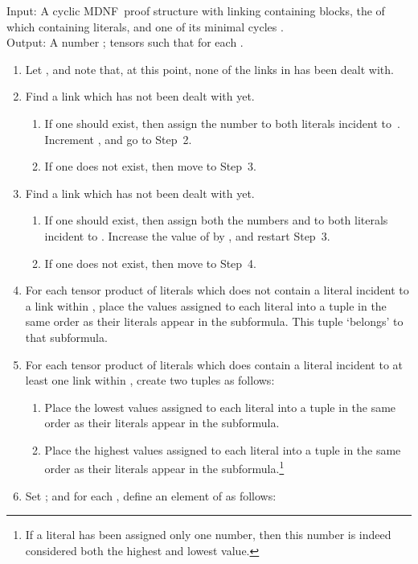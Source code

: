 \documentclass{LMCS}
\theoremstyle{plain}\newtheorem*{cLm}{Claim}
\begin{document}
\begin{algo} \label{AcyclicAlg} Input: A cyclic MDNF~proof structure with linking  containing  blocks, the  of which containing  literals, and one of its minimal cycles . \\ Output: A number ;
  tensors  such that  for each .
\end{algo}
\begin{enumerate}
\item Let , and note that, at this point, none of the links in  has been dealt
  with.

\item Find a link  which has
  not been dealt with yet.
  \begin{enumerate}
  \item If one should exist, then assign the number  to both
    literals incident to~. Increment , and go to Step~2.
  \item If one does not exist, then move to Step~3.
  \end{enumerate}

\item Find a link  which has not been dealt with
  yet.
  \begin{enumerate}
  \item If one should exist, then assign both the numbers  and
     to both literals incident to . Increase the value of 
    by , and restart Step~3.
  \item If one does not exist, then move to Step~4.
  \end{enumerate}
	
\item For each tensor product of literals which does not contain a
  literal incident to a link within , place the values
  assigned to each literal into a tuple in the same order as their
  literals appear in the subformula. This tuple `belongs' to that
  subformula.

\item For each tensor product of literals which does contain a
  literal incident to at least one link within ,
  create two tuples as follows:
  \begin{enumerate}
  \item Place the lowest values assigned to each literal into a tuple
    in the same order as their literals appear in the subformula.
  \item Place the highest values assigned to each literal into a
    tuple in the same order as their literals appear in the
    subformula.\footnote{If a literal has been assigned only one
      number, then this number is indeed considered both the highest
      and lowest value.}
  \end{enumerate}
	
\item Set ; and for each , define an element
   of  as follows:
  \smallskip
\end{enumerate}
\end{document}
